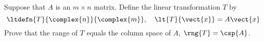 Suppose that $A$ is an $m\times n$ matrix.  Define the linear transformation $T$ by
%
\begin{equation*}
\ltdefn{T}{\complex{n}}{\complex{m}},\quad \lt{T}{\vect{x}}=A\vect{x}
\end{equation*}
%
Prove that the range of $T$ equals the column space of $A$, $\rng{T}=\csp{A}$. 
